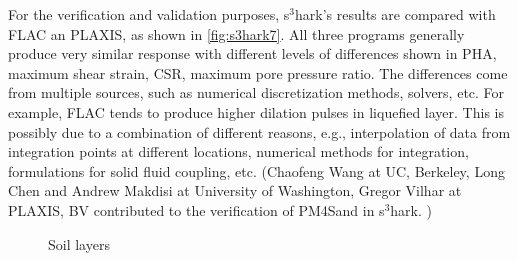 For the verification and validation purposes, s$^3$hark's results are compared with FLAC an PLAXIS, as shown in \autoref{fig:s3hark7}. 
All three programs generally produce very similar response with
different levels of differences shown in PHA, maximum shear strain, CSR, maximum pore pressure ratio. 
The differences come from multiple sources, such as numerical discretization methods, solvers, etc.
For example, FLAC tends to produce higher dilation pulses in liquefied layer. 
This is possibly due to a combination of different reasons, e.g.,
interpolation of data from integration points at different
locations, numerical methods for integration, formulations for
solid fluid coupling, etc.
(Chaofeng Wang at UC, Berkeley, Long Chen and Andrew Makdisi at University of Washington,  
Gregor Vilhar at PLAXIS, BV contributed to the verification of PM4Sand in s$^3$hark. )

\begin{figure}[!htbp]
  \caption{Soil layers }
  \label{fig:s3hark7}
\end{figure}






